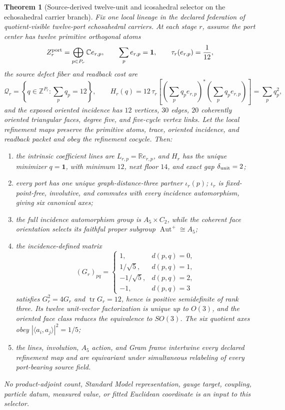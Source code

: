 \documentclass[11pt]{article}
\newtheorem{theorem}{Theorem}[section]
\begin{document}
\begin{theorem}[Source-derived twelve-unit and icosahedral selector on the
echosahedral carrier branch]
\label{thm:echosahedral-source-selector}
Fix one local lineage in the declared federation of quotient-visible
twelve-port echosahedral carriers. At each stage \(r\), assume the port center
has twelve primitive orthogonal atoms
\[
 Z_r^{\rm port}=\bigoplus_{p\in P_r}\mathbb C e_{r,p},
 \qquad
 \sum_pe_{r,p}=\mathbf1,
 \qquad
 \tau_r(e_{r,p})=\frac1{12},
\]
the source defect fiber and readback cost are
\[
 \mathcal Q_r=\left\{q\in\mathbb Z^{P_r}:\sum_pq_p=12\right\},
 \qquad
 H_r(q)=12\,\tau_r\!\left[
 \left(\sum_pq_pe_{r,p}\right)^*
 \left(\sum_pq_pe_{r,p}\right)\right]
 =\sum_pq_p^2,
\]
and the exposed oriented incidence has \(12\) vertices, \(30\) edges, \(20\)
coherently oriented triangular faces, degree five, and five-cycle vertex
links. Let the local refinement maps preserve the primitive atoms, trace,
oriented incidence, and readback packet and obey the refinement cocycle.
Then:
\begin{enumerate}[label=\textup{(\roman*)},leftmargin=2em]
\item the intrinsic coefficient lines are
      \(L_{r,p}=\mathbb R e_{r,p}\), and \(H_r\) has the unique minimizer
      \(q=\mathbf1\), with minimum \(12\), next floor \(14\), and exact gap
      \(\delta_{\rm unit}=2\);
\item every port has one unique graph-distance-three partner
      \(\iota_r(p)\); \(\iota_r\) is fixed-point-free, involutive, and
      commutes with every incidence automorphism, giving six canonical axes;
\item the full incidence automorphism group is \(A_5\times C_2\), while the
      coherent face orientation selects its faithful proper subgroup
      \(\operatorname{Aut}^+\cong A_5\);
\item the incidence-defined matrix
      \[
      (G_r)_{pq}=
      \begin{cases}
      1,&d(p,q)=0,\\
      1/\sqrt5,&d(p,q)=1,\\
      -1/\sqrt5,&d(p,q)=2,\\
      -1,&d(p,q)=3
      \end{cases}
      \]
      satisfies \(G_r^2=4G_r\) and \(\operatorname{tr}G_r=12\), hence is
      positive semidefinite of rank three. Its twelve unit-vector
      factorization is unique up to \(O(3)\), and the oriented face class
      reduces the equivalence to \(SO(3)\). The six quotient axes obey
      \(|\langle a_i,a_j\rangle|^2=1/5\);
\item the lines, involution, \(A_5\) action, and Gram frame intertwine every
      declared refinement map and are equivariant under simultaneous
      relabeling of every port-bearing source field.
\end{enumerate}
No product-adjoint count, Standard Model representation, gauge target,
coupling, particle datum, measured value, or fitted Euclidean coordinate is
an input to this selector.
\end{theorem}
\end{document}
